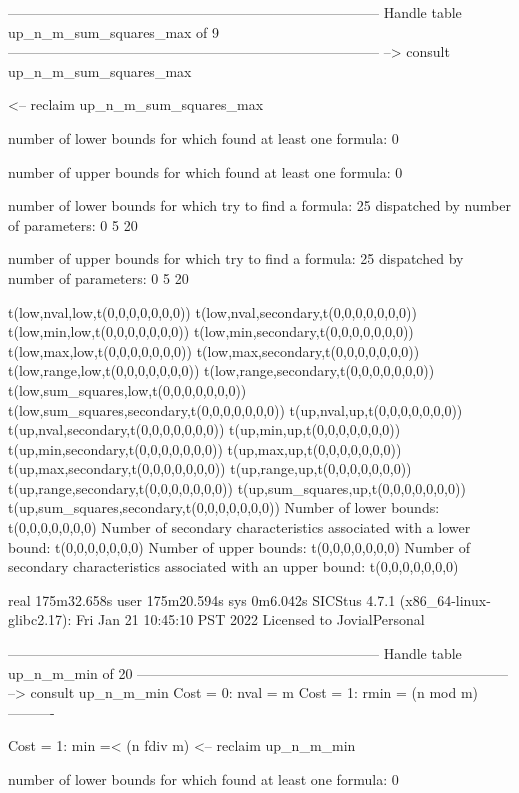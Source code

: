 --------------------------------------------------------------------------------
Handle table up_n_m_sum_squares_max of 9
--------------------------------------------------------------------------------
--> consult up_n_m_sum_squares_max

<-- reclaim up_n_m_sum_squares_max

number of lower bounds for which found at least one formula: 0

number of upper bounds for which found at least one formula: 0

number of lower bounds for which try to find a formula: 25
dispatched by number of parameters: 0  5  20

number of upper bounds for which try to find a formula: 25
dispatched by number of parameters: 0  5  20

t(low,nval,low,t(0,0,0,0,0,0,0))
t(low,nval,secondary,t(0,0,0,0,0,0,0))
t(low,min,low,t(0,0,0,0,0,0,0))
t(low,min,secondary,t(0,0,0,0,0,0,0))
t(low,max,low,t(0,0,0,0,0,0,0))
t(low,max,secondary,t(0,0,0,0,0,0,0))
t(low,range,low,t(0,0,0,0,0,0,0))
t(low,range,secondary,t(0,0,0,0,0,0,0))
t(low,sum_squares,low,t(0,0,0,0,0,0,0))
t(low,sum_squares,secondary,t(0,0,0,0,0,0,0))
t(up,nval,up,t(0,0,0,0,0,0,0))
t(up,nval,secondary,t(0,0,0,0,0,0,0))
t(up,min,up,t(0,0,0,0,0,0,0))
t(up,min,secondary,t(0,0,0,0,0,0,0))
t(up,max,up,t(0,0,0,0,0,0,0))
t(up,max,secondary,t(0,0,0,0,0,0,0))
t(up,range,up,t(0,0,0,0,0,0,0))
t(up,range,secondary,t(0,0,0,0,0,0,0))
t(up,sum_squares,up,t(0,0,0,0,0,0,0))
t(up,sum_squares,secondary,t(0,0,0,0,0,0,0))
Number of lower bounds:                                             t(0,0,0,0,0,0,0)
Number of secondary characteristics associated with a lower bound:  t(0,0,0,0,0,0,0)
Number of upper bounds:                                             t(0,0,0,0,0,0,0)
Number of secondary characteristics associated with an upper bound: t(0,0,0,0,0,0,0)

real	175m32.658s
user	175m20.594s
sys	0m6.042s
SICStus 4.7.1 (x86_64-linux-glibc2.17): Fri Jan 21 10:45:10 PST 2022
Licensed to JovialPersonal


--------------------------------------------------------------------------------
Handle table up_n_m_min of 20
--------------------------------------------------------------------------------
--> consult up_n_m_min
Cost =  0:  nval = m
Cost =  1:  rmin = (n mod m)
----------

Cost =  1:  min =< (n fdiv m)
<-- reclaim up_n_m_min

number of lower bounds for which found at least one formula: 0

